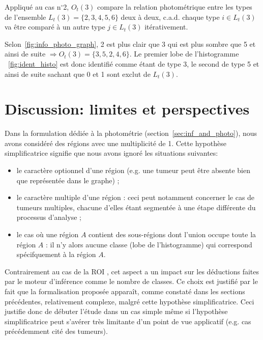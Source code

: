 
	Appliqué au cas n$^{\circ}$2, $O_t(3)$ compare la relation photométrique entre les types de l'ensemble $L_t(3) = \{2,3,4,5,6\}$ deux à deux, c.a.d. chaque type {\bf $i\in L_t(3)$} va être comparé à un autre type $j\in L_t(3)$ itérativement. 
	
	Selon~\ref{fig:info_photo_graph}, 2 est plus clair que 3 qui est plus sombre que 5 et ainsi de suite $\Rightarrow O_t(3) = \{3,5,2,4,6\}$. Le premier lobe de l'histogramme ~\ref{fig:ident_histo} est donc identifié comme étant de type 3, le second de type 5 et ainsi de suite sachant que 0 et 1 sont exclut de $L_t(3)$.

\newpage
	\section{Discussion: limites et perspectives}

	Dans la formulation dédiée à la photométrie (section~\ref{sec:inf_and_photo}), nous avons considéré des régions avec une multiplicité de 1. Cette hypothèse simplificatrice signifie que nous avons ignoré les situations suivantes:
\begin{itemize}
\item le caractère optionnel d'une région (e.g. une tumeur peut être absente bien que représentée dans le graphe) ;
\item le caractère multiple d'une région : ceci peut notamment concerner le cas de tumeurs multiples, chacune d'elles étant segmentée à une étape différente du processus d'analyse ;
\item le cas où une région $A$ contient des sous-régions dont l'union occupe toute la région $A$ : il n'y alors aucune classe (lobe de l'histogramme) qui correspond spécifquement à la région $A$.
\end{itemize}\vspace{1em}

	Contrairement au cas de la ROI \citep[Fasquel]{Fasquel2006}, cet aspect a un impact sur les déductions faites par le moteur d'inférence comme le nombre de classes. Ce choix est justifié par le fait que la formalisation proposée apparaît, comme constaté dans les sections précédentes, relativement complexe, malgré cette hypothèse simplificatrice. Ceci justifie donc de débuter l'étude dans un cas simple même si l'hypothèse simplificatrice peut s'avérer très limitante d'un point de vue applicatif (e.g. cas précédemment cité des tumeurs). 

